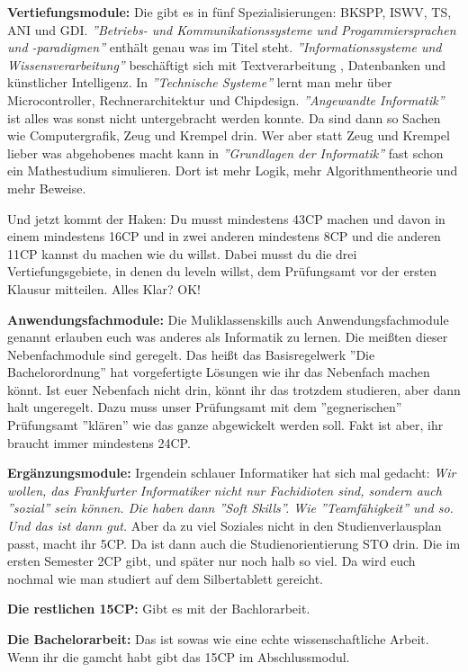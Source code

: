 \textbf{Vertiefungsmodule:}
Die gibt es in f\"unf Spezialisierungen: BKSPP, ISWV, TS, ANI und GDI. \emph{''Betriebs-
und Kommunikationssysteme und Progammiersprachen und -paradigmen''} enth\"alt
genau was im Titel steht. \emph{''Informationssysteme und Wissensverarbeitung''}
besch\"aftigt sich mit Textverarbeitung , Datenbanken und k\"unstlicher
Intelligenz. In \emph{''Technische Systeme''} lernt man mehr \"uber Microcontroller,
Rechnerarchitektur und Chipdesign. \emph{''Angewandte Informatik''} ist alles was
sonst nicht untergebracht werden konnte. Da sind dann so Sachen wie
Computergrafik, Zeug und Krempel drin. Wer aber statt Zeug und Krempel lieber
was abgehobenes macht kann in \emph{''Grundlagen der Informatik''} fast schon ein
Mathestudium simulieren. Dort ist mehr Logik, mehr Algorithmentheorie und mehr
Beweise.

Und jetzt kommt der Haken: Du musst mindestens 43CP machen und davon in einem
mindestens 16CP und in zwei anderen mindestens 8CP und die anderen 11CP kannst
du machen wie du willst. Dabei musst du die drei Vertiefungsgebiete, in denen
du leveln willst, dem Pr\"ufungsamt vor der ersten Klausur mitteilen. Alles
Klar? OK!

\textbf{Anwendungsfachmodule:}
Die Muliklassenskills auch Anwendungsfachmodule genannt erlauben euch was anderes als Informatik zu lernen.
Die mei{\ss}ten dieser Nebenfachmodule sind geregelt. Das hei{\ss}t das
Basisregelwerk ''Die Bachelorordnung'' hat vorgefertigte L\"osungen wie ihr das
Nebenfach machen k\"onnt. Ist euer Nebenfach nicht drin, k\"onnt ihr das trotzdem studieren, aber dann halt ungeregelt.
Dazu muss unser Pr\"ufungsamt mit dem ''gegnerischen'' Pr\"ufungsamt ''kl\"aren'' wie das ganze abgewickelt werden soll.
Fakt ist aber, ihr braucht immer mindestens 24CP.

\textbf{Erg\"anzungsmodule:}
Irgendein schlauer Informatiker hat sich mal gedacht: \emph{Wir wollen, das
Frankfurter Informatiker nicht nur Fachidioten sind, sondern auch ''sozial''
sein k\"onnen. Die haben dann ''Soft Skills''. Wie ''Teamf\"ahigkeit'' und so. Und das
ist dann gut.} Aber da zu viel Soziales nicht in den Studienverlausplan passt, macht ihr 5CP.
Da ist dann auch die Studienorientierung STO drin. Die im ersten Semester 2CP gibt, und sp\"ater nur noch halb so viel.
Da wird euch nochmal wie man studiert auf dem Silbertablett gereicht.

\textbf{Die restlichen 15CP:}
Gibt es mit der Bachlorarbeit.

\textbf{Die Bachelorarbeit:}
Das ist sowas wie eine echte wissenschaftliche Arbeit. Wenn ihr die gamcht habt gibt das 15CP im Abschlussmodul.

